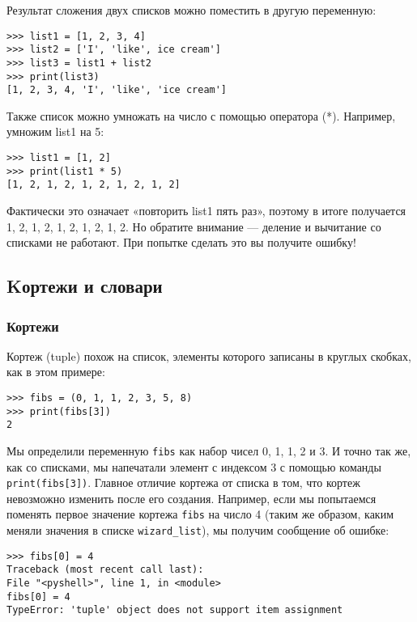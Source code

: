 \documentclass[11pt]{article}
\begin{document}
Результат сложения двух списков можно поместить в другую переменную:

\begin{verbatim}
>>> list1 = [1, 2, 3, 4]
>>> list2 = ['I', 'like', ice cream']
>>> list3 = list1 + list2
>>> print(list3)
[1, 2, 3, 4, 'I', 'like', 'ice cream']
\end{verbatim}

Также список можно умножать на число с помощью оператора (*). Например,
умножим list1 на 5:

\begin{verbatim}
>>> list1 = [1, 2]
>>> print(list1 * 5)
[1, 2, 1, 2, 1, 2, 1, 2, 1, 2]
\end{verbatim}

Фактически это означает «повторить list1 пять раз», поэтому в итоге
получается 1, 2, 1, 2, 1, 2, 1, 2, 1, 2. Но обратите внимание ---
деление и вычитание со списками не работают. При попытке сделать это вы
получите ошибку!

\subsection{Kортежи и
словари}\label{kux43eux440ux442ux435ux436ux438-ux438-ux441ux43bux43eux432ux430ux440ux438}

\subsubsection{Кортежи}\label{ux43aux43eux440ux442ux435ux436ux438}

Кортеж (tuple) похож на список, элементы которого записаны в круглых
скобках, как в этом примере:

\begin{verbatim}
>>> fibs = (0, 1, 1, 2, 3, 5, 8)
>>> print(fibs[3])
2
\end{verbatim}

Мы определили переменную \texttt{fibs} как набор чисел 0, 1, 1, 2 и 3. И
точно так же, как со списками, мы напечатали элемент с индексом 3 с
помощью команды \texttt{print(fibs{[}3{]})}. Главное отличие кортежа от
списка в том, что кортеж невозможно изменить после его создания.
Например, если мы попытаемся поменять первое значение кортежа
\texttt{fibs} на число 4 (таким же образом, каким меняли значения в
списке \texttt{wizard\_list}), мы получим сообщение об ошибке:

\begin{verbatim}
>>> fibs[0] = 4
Traceback (most recent call last):
File "<pyshell>", line 1, in <module>
fibs[0] = 4
TypeError: 'tuple' object does not support item assignment
\end{verbatim}
\end{document}
